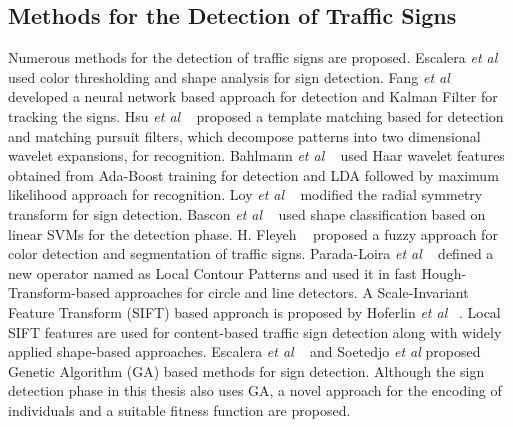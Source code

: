 \documentclass[a4paper,oneside,12pt]{report}
\begin{document}
\subsection{Methods for the Detection of Traffic Signs}
Numerous methods for the detection of traffic signs are proposed. Escalera \textit{et al} ~\cite{de_la_escalera_road_1997} used color thresholding and shape analysis for sign detection. Fang \textit{et al} ~\cite{chiung-yao_fang_road-sign_2003} developed a neural network based approach for detection and Kalman Filter for tracking the signs. Hsu \textit{et al} ~\cite{hsu_road_2001} proposed a template matching based for detection and matching pursuit filters, which decompose patterns into two dimensional wavelet expansions, for recognition. Bahlmann \textit{et al} ~\cite{bahlmann_system_2005} used Haar wavelet features obtained from Ada-Boost training for detection and LDA followed by maximum likelihood approach for recognition. Loy \textit{et al} ~\cite{loy_fast_2004} modified the radial symmetry transform for sign detection. Bascon \textit{et al} ~\cite{maldonado-bascon_road-sign_2007} used shape classification based on linear SVMs for the detection phase. H. Fleyeh ~\cite{fleyeh_road_2005} proposed a fuzzy approach for color detection and segmentation of traffic signs. Parada-Loira \textit{et al} ~\cite{parada-loira_local_2010} defined a new operator named as Local Contour Patterns and used it in fast Hough-Transform-based approaches for circle and line detectors. A Scale-Invariant Feature Transform (SIFT) based approach is proposed by Hoferlin \textit{et al} ~\cite{hoferlin_towards_2009}. Local SIFT features are used for content-based traffic sign detection along with widely applied shape-based approaches. Escalera \textit{et al} ~\cite{de_la_escalera_traffic_2003} and Soetedjo \textit{et al} proposed Genetic Algorithm (GA) based methods for sign detection. Although the sign detection phase in this thesis also uses GA, a novel approach for the encoding of individuals and a suitable fitness function are proposed. 
\end{document}
